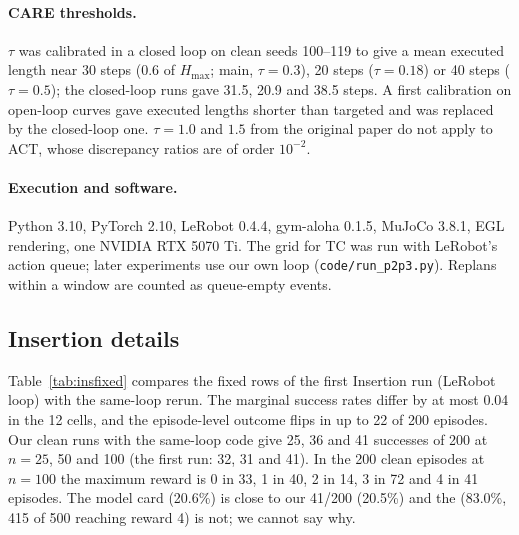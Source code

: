 \documentclass[11pt]{article}
\newcommand{\fixed}{\textsf{fixed}\xspace}
\begin{document}
\paragraph{CARE thresholds.} $\tau$ was calibrated in a closed loop on clean seeds 100--119 to give a mean executed length near 30 steps (0.6 of $H_{\max}$; main, $\tau{=}0.3$), 20 steps ($\tau{=}0.18$) or 40 steps ($\tau{=}0.5$); the closed-loop runs gave 31.5, 20.9 and 38.5 steps. A first calibration on open-loop curves gave executed lengths shorter than targeted and was replaced by the closed-loop one. $\tau{=}1.0$ and $1.5$ from the original paper do not apply to ACT, whose discrepancy ratios are of order $10^{-2}$.

\paragraph{Execution and software.} Python 3.10, PyTorch 2.10, LeRobot 0.4.4, gym-aloha 0.1.5, MuJoCo 3.8.1, EGL rendering, one NVIDIA RTX 5070 Ti. The grid for TC was run with LeRobot's action queue; later experiments use our own loop (\texttt{code/run\_p2p3.py}). Replans within a window are counted as queue-empty events.

\subsection{Insertion details}\label{app:ins}
Table~\ref{tab:insfixed} compares the \fixed rows of the first Insertion run (LeRobot loop) with the same-loop rerun. The marginal success rates differ by at most 0.04 in the 12 cells, and the episode-level outcome flips in up to 22 of 200 episodes. Our clean runs with the same-loop code give 25, 36 and 41 successes of 200 at $n{=}25$, 50 and 100 (the first run: 32, 31 and 41). In the 200 clean episodes at $n{=}100$ the maximum reward is 0 in 33, 1 in 40, 2 in 14, 3 in 72 and 4 in 41 episodes. The model card (20.6\%) is close to our 41/200 (20.5\%) and the  (83.0\%, 415 of 500 reaching reward 4) is not; we cannot say why.
\begin{table}[h]
\centering\small

\caption{Insertion, reward${=}4$: old \fixed\ (LeRobot loop, float32) and the same-loop rerun (float64); ``flips'': seeds whose outcome differs.}
\label{tab:insfixed}
\end{table}
\end{document}

